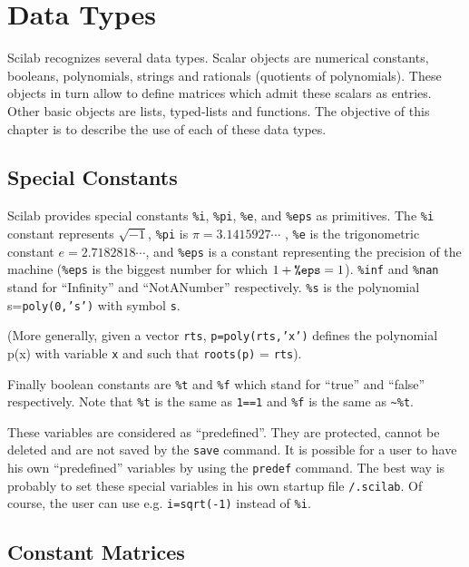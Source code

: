 
\chapter{Data Types}
\label{ch2}
Scilab recognizes several data types.
 Scalar objects are numerical constants, booleans, polynomials, strings and 
rationals (quotients of polynomials). These objects in turn allow to 
define matrices which admit these scalars as entries.
Other basic objects are lists, typed-lists and functions.
%
The objective of this chapter is to describe the use of each of 
these data types.

\section{Special Constants}
\label{s2.1}

	Scilab provides special constants {\tt \%i}, {\tt \%pi},
{\tt \%e}, and {\tt \%eps} as primitives.  The {\tt \%i} constant
represents $\sqrt{-1}$, {\tt \%pi} is $\pi=3.1415927\cdots$ , {\tt \%e}
is the trigonometric constant $e=2.7182818\cdots$, and {\tt \%eps}
is a constant representing the precision of the machine ({\tt \%eps}
is the biggest number for which $1+\mbox{\tt \%eps}=1$). {\tt \%inf}
and {\tt \%nan} stand for ``Infinity'' and ``NotANumber'' respectively.
{\tt \%s} is the polynomial s={\tt poly(0,'s')} with symbol {\tt s}.

(More generally, given a vector {\tt rts}, {\tt p=poly(rts,'x')}
defines the polynomial p(x) with variable {\tt x} and such 
that {\tt roots(p)} = {\tt rts}).

Finally boolean constants are {\tt \%t} and {\tt \%f} which stand for
``true'' and ``false'' respectively. Note that {\tt \%t} is the
same as {\tt 1==1} and {\tt \%f} is the same as {\verb!~%t!}.

These variables are considered as ``predefined''. They are protected, cannot 
be deleted and are not saved by the {\tt save} command. It is possible
for a user to have his own ``predefined'' variables by using the
{\tt predef} command. The best way is probably to set these special variables
in his own startup file {\tt <home dir>/.scilab}.
Of course, the user can use e.g. {\tt i=sqrt(-1)} instead of {\tt \%i}.

\section{Constant Matrices}
\label{s2.2}

